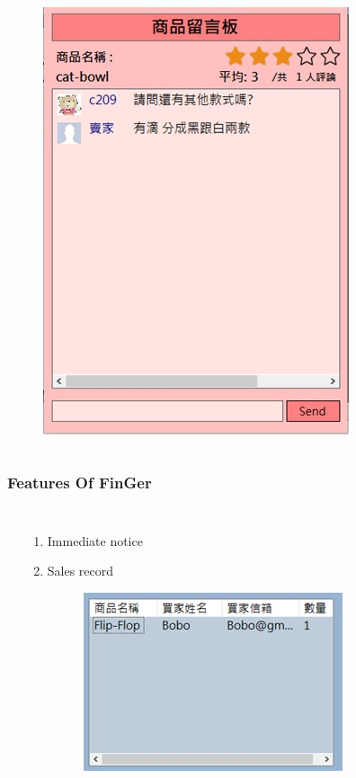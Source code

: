 \documentclass{beamer}
\begin{document}
\begin{CJK}{UTF8}{bsmi}
\begin{frame}
\begin{columns}[c]

\begin{figure}
\includegraphics[width=0.6\linewidth]{star.jpg}
\end{figure}

\end{columns}

\end{frame}


\begin{frame}
\frametitle{Features Of FinGer}
\begin{columns}[c]
\textbf{}
\begin{enumerate}
\item Immediate notice
\item Sales record
\vspace{10pt}

\begin{figure}
\includegraphics[width=0.5\linewidth]{record.jpg}
\end{figure}
\end{enumerate}


\end{columns}
\end{frame}
\end{CJK}
\end{document}
